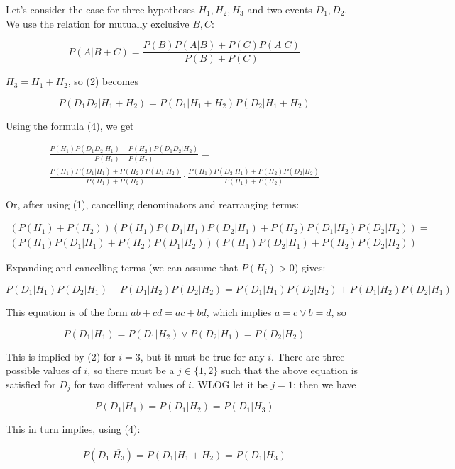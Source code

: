 \documentclass{../note}
\begin{document}
\begin{solution}
Let's consider the case for three hypotheses $H_1, H_2, H_3$ and two events $D_1, D_2$. We use the relation for mutually exclusive $B, C$:

\begin{equation}
P(A | B + C) = \frac{P(B)P(A|B) + P(C)P(A|C)}{P(B) + P(C)}
\end{equation}

$\overline{H_3} = H_1 + H_2$, so (2) becomes

\begin{equation*}
P(D_1D_2|H_1 + H_2) = P(D_1|H_1 + H_2)P(D_2|H_1 + H_2)
\end{equation*}

Using the formula (4), we get

\begin{gather*}
\frac{P(H_1)P(D_1D_2|H_1) + P(H_2)P(D_1D_2|H_2)}{P(H_1) + P(H_2)} =\\
\frac{P(H_1)P(D_1|H_1) + P(H_2)P(D_1|H_2)}{P(H_1) + P(H_2)} \cdot 
\frac{P(H_1)P(D_2|H_1) + P(H_2)P(D_2|H_2)}{P(H_1) + P(H_2)}
\end{gather*}

Or, after using (1), cancelling denominators and rearranging terms:

\begin{gather*}
(P(H_1) + P(H_2))(P(H_1)P(D_1|H_1)P(D_2|H_1) + P(H_2)P(D_1|H_2)P(D_2|H_2)) =\\
(P(H_1)P(D_1|H_1) + P(H_2)P(D_1|H_2))(P(H_1)P(D_2|H_1) + P(H_2)P(D_2|H_2))
\end{gather*}

Expanding and cancelling terms (we can assume that $P(H_i)>0$) gives:

\begin{equation*}
P(D_1|H_1)P(D_2|H_1) + P(D_1|H_2)P(D_2|H_2) = P(D_1|H_1)P(D_2|H_2) + P(D_1|H_2)P(D_2|H_1)
\end{equation*}

This equation is of the form $ab + cd = ac + bd$, which implies $a = c \vee b = d$, so

\begin{equation*}
P(D_1|H_1) = P(D_1|H_2) \vee P(D_2|H_1) = P(D_2|H_2)
\end{equation*}

This is implied by (2) for $i=3$, but it must be true for any $i$. There are three possible values of $i$, so there must be a $j \in \{1, 2\}$ such that the above equation is satisfied for $D_j$ for two different values of $i$. WLOG let it be $j=1$; then we have

\begin{equation*}
P(D_1|H_1) = P(D_1|H_2) = P(D_1|H_3)
\end{equation*}

This in turn implies, using (4):

\begin{gather*}
P(D_1|\overline{H_3}) = P(D_1|H_1 + H_2) = P(D_1|H_3)
\end{gather*}
\end{solution}
\end{document}
